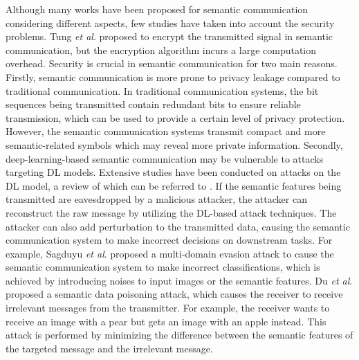 \documentclass[conference]{IEEEtran}
\begin{document}

Although many works have been proposed for semantic communication considering different aspects, few studies have taken into account the security problems\cite{tung2022deep, sagduyu2022semantic, du2022rethinking}. Tung \emph{et al}.\cite{tung2022deep} proposed to encrypt the transmitted signal in semantic communication, but the encryption algorithm incurs a large computation overhead. Security is crucial in semantic communication for two main reasons. Firstly, semantic communication is more prone to privacy leakage compared to traditional communication. In traditional communication systems, the bit sequences being transmitted contain redundant bits to ensure reliable transmission, which can be used to provide a certain level of privacy protection. However, the semantic communication systems transmit compact and more semantic-related symbols which may reveal more private information. Secondly, deep-learning-based semantic communication may be vulnerable to attacks targeting DL models. Extensive studies have been conducted on attacks on the DL model, a review of which can be referred to \cite{liu2020privacy}. If the semantic features being transmitted are eavesdropped by a malicious attacker, the attacker can reconstruct the raw message by utilizing the DL-based attack techniques. The attacker can also add perturbation to the transmitted data, causing the semantic communication system to make incorrect decisions on downstream tasks. For example, Sagduyu \emph{et al}. \cite{sagduyu2022semantic} proposed a multi-domain evasion attack to cause the semantic communication system to make incorrect classifications, which is achieved by introducing noises to input images or the semantic features. Du \emph{et al}.\cite{du2022rethinking} proposed a semantic data poisoning attack, which causes the receiver to receive irrelevant messages from the transmitter. For example, the receiver wants to receive an image with a pear but gets an image with an apple instead. This attack is performed by minimizing the difference between the semantic features of the targeted message and the irrelevant message.

\end{document}
